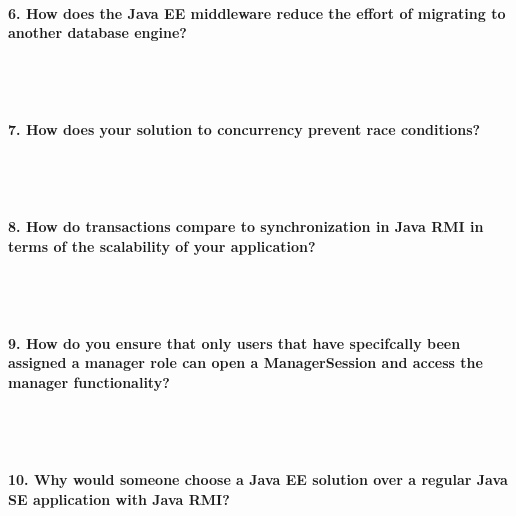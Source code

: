 \documentclass{ds-report}
\begin{document}
	\paragraph{6. How does the Java EE middleware reduce the effort of migrating to another database engine?} \mbox{}\\\\





 

	\paragraph{7. How does your solution to concurrency prevent race conditions?} \mbox{}\\\\






	\paragraph{8. How do transactions compare to synchronization in Java RMI in terms of the scalability of your application?} \mbox{}\\\\









	\paragraph{9. How do you ensure that only users that have specifcally been assigned a manager role can open a ManagerSession and access the manager functionality?} \mbox{}\\\\








	\paragraph{10.  Why would someone choose a Java EE solution over a regular Java SE application with Java RMI?} \mbox{}\\\\



	
	\clearpage

	
\end{document}
